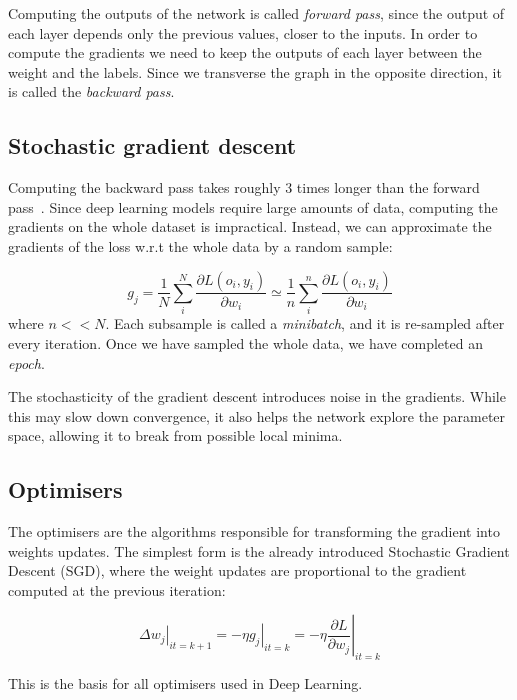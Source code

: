 Computing the outputs 
of the network is called \emph{forward pass}, since the output of each layer depends only the previous values, closer to the inputs.
In order to compute the gradients we need to keep the outputs of each layer between the weight and the labels.
Since we transverse the graph in the opposite direction, it is called the \emph{backward pass}.

\subsection{Stochastic gradient descent}\label{sec:sgd}
Computing the backward pass takes roughly 3 times longer than the forward pass~\citep{dl_course}.
Since deep learning models require large amounts of data, computing the gradients on the whole dataset is impractical.
Instead, we can approximate the gradients of the loss w.r.t the whole data by a random sample:

\begin{equation*}
g_j = \frac{1}{N} \sum_i^N \frac{\partial L\left(o_i, y_i\right)}{\partial w_i} \simeq \frac{1}{n} \sum_i^n \frac{\partial L\left(o_i, y_i\right)}{\partial w_i}
\end{equation*}
where $n << N$.
Each subsample is called a \emph{minibatch}, 
and it is re-sampled after every iteration.
Once we have sampled the whole data, we have completed an \emph{epoch}.

The stochasticity of the gradient descent introduces noise in the gradients.
While this may slow down convergence, it also helps the network explore the parameter space, allowing it to break from possible local minima.

\subsection{Optimisers}
The optimisers are the algorithms responsible for transforming the gradient into weights updates.
The simplest form is the already introduced Stochastic Gradient Descent (SGD), 
where the weight updates are proportional to the gradient computed at the previous iteration:

\begin{equation*}
\left.\Delta w_j\right|_{it=k+1} = - \left.\eta g_j\right|_{it=k} = - \eta \left.\frac{\partial L}{\partial w_j}\right|_{it=k}
\end{equation*}

This is the basis for all optimisers used in Deep Learning.


